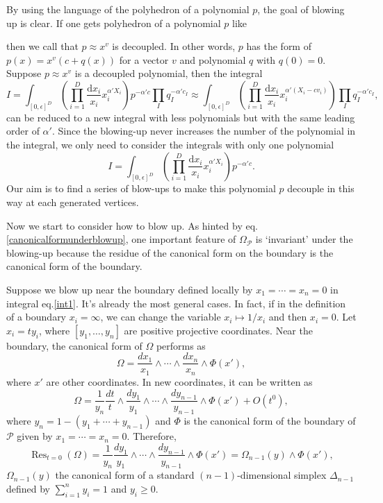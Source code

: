 \documentclass[12pt]{article}
\theoremstyle{definition}
\theoremstyle{plain}
\newcommand{\dif}{\mathrm{d}} %
\begin{document}
By using the language of the polyhedron of a polynomial $p$, the goal of blowing up is clear.
If one gets polyhedron of a polynomial $p$ like
\begin{center}
\end{center}
then we call that $p\approx x^v$ is decoupled. In other words, $p$ has the form of 
\(
p(x)=x^v(c+q(x))
\) for a vector $v$ and polynomial $q$ with $q(0)=0$. 
Suppose $p\approx x^v$ is a decoupled polynomial, then
the integral
\[
	I=\int_{[0,\epsilon]^D} \left(\prod_{i=1}^D\frac{\dif x_i}{x_i}x_i^{\alpha' X_i}\right)
	p^{-\alpha' c} \prod_I q_I^{-\alpha' c_I}
	\approx\int_{[0,\epsilon]^D} \left(\prod_{i=1}^D\frac{\dif x_i}{x_i}x_i^{\alpha' (X_i-cv_i)}\right)
	\prod_I q_I^{-\alpha' c_I},
\] 
can be reduced to a new integral with less polynomials but with the same leading order of $\alpha'$. 
Since the blowing-up never increases the 
number of the polynomial in the integral, we only need to consider the integrals with only one 
polynomial
\[
	I=\int_{[0,\epsilon]^D} \left(\prod_{i=1}^D\frac{\dif x_i}{x_i}x_i^{\alpha' X_i}\right)
	p^{-\alpha' c}.
\] 
Our aim is to find a series of blow-ups to make this polynomial $p$ decouple in this way at
each generated vertices.

Now we start to consider how to blow up. 
As hinted by eq.\eqref{canonicalformunderblowup}, one important feature of $\Omega_{\mathcal P}$
is `invariant' under the blowing-up because the residue of the canonical form on the boundary is
the canonical form of the boundary.

Suppose we blow up near the boundary defined locally by $x_1=\cdots=x_n=0$ in integral eq.\eqref{int1}. 
It's already the most general cases. In fact, if in the definition of a boundary $x_i=\infty$, we can
change the variable $x_i\mapsto 1/x_i$ and then $x_i=0$.
Let $x_i=ty_i$, where $[y_1,\dots,y_n]$ are positive projective coordinates. 
Near the boundary, the canonical form of $\Omega$ performs as 
\[
	\Omega=\frac{dx_1}{x_1}\wedge \cdots\wedge\frac{dx_n}{x_n}
	\wedge \Phi(x'),
\]
where $x'$ are other coordinates. In new coordinates, it can be written as 
\[
	\Omega=\frac{1}{y_n}\frac{dt}{t}\wedge \frac{dy_1}{y_1}\wedge \cdots
	\wedge\frac{dy_{n-1}}{y_{n-1}}\wedge \Phi(x')+O(t^0),
\]
where $y_n=1-(y_1+\cdots+y_{n-1})$ and $\Phi$ is the canonical form of the boundary of $\mathcal P$ given by $x_1=\cdots=x_n=0$. Therefore,
\[
	\operatorname{Res}_{t=0}(\Omega)=\frac{1}{y_n}\frac{dy_1}{y_1}\wedge \cdots\wedge\frac{dy_{n-1}}{y_{n-1}}\wedge \Phi(x')=\Omega_{n-1}(y)\wedge \Phi(x'),
\]
$\Omega_{n-1}(y)$ the canonical form of a standard $(n-1)$-dimensional simplex $\Delta_{n-1}$ defined by
$
	\sum_{i=1}^n y_i=1
$ and $y_i\geq 0$. 
\end{document}
